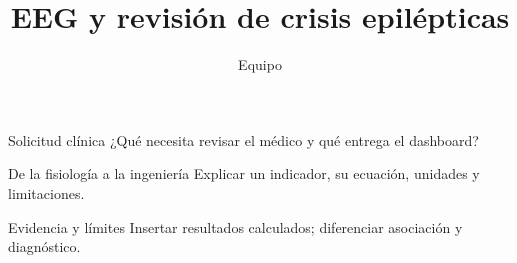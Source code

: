 \documentclass[aspectratio=169]{beamer}
\title{EEG y revisión de crisis epilépticas}
\author{Equipo}
\begin{document}
\frame{\titlepage}
\begin{frame}{Solicitud clínica}
¿Qué necesita revisar el médico y qué entrega el dashboard?
\end{frame}
\begin{frame}{De la fisiología a la ingeniería}
Explicar un indicador, su ecuación, unidades y limitaciones.
\end{frame}
\begin{frame}{Evidencia y límites}
Insertar resultados calculados; diferenciar asociación y diagnóstico.
\end{frame}
\end{document}
